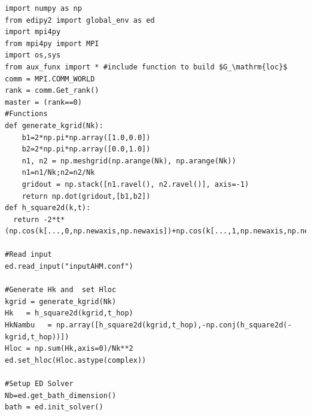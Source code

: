 \documentclass[edipack2.tex]{subfiles}
\begin{document}
\begin{lstlisting}[style=mypython,numbers=none,basicstyle={\scriptsize\ttfamily}]
import numpy as np
from edipy2 import global_env as ed
import mpi4py
from mpi4py import MPI
import os,sys
from aux_funx import * #include function to build $G_\mathrm{loc}$ 
comm = MPI.COMM_WORLD
rank = comm.Get_rank()
master = (rank==0)
#Functions
def generate_kgrid(Nk):
    b1=2*np.pi*np.array([1.0,0.0])
    b2=2*np.pi*np.array([0.0,1.0])
    n1, n2 = np.meshgrid(np.arange(Nk), np.arange(Nk))
    n1=n1/Nk;n2=n2/Nk
    gridout = np.stack([n1.ravel(), n2.ravel()], axis=-1)
    return np.dot(gridout,[b1,b2])
def h_square2d(k,t):
  return -2*t*(np.cos(k[...,0,np.newaxis,np.newaxis])+np.cos(k[...,1,np.newaxis,np.newaxis]))*np.eye(ed.Norb)
    
#Read input
ed.read_input("inputAHM.conf")

#Generate Hk and  set Hloc
kgrid = generate_kgrid(Nk)
Hk   = h_square2d(kgrid,t_hop)
HkNambu   = np.array([h_square2d(kgrid,t_hop),-np.conj(h_square2d(-kgrid,t_hop))])
Hloc = np.sum(Hk,axis=0)/Nk**2
ed.set_hloc(Hloc.astype(complex))

#Setup ED Solver
Nb=ed.get_bath_dimension()
bath = ed.init_solver()
\end{lstlisting}
\end{document}
